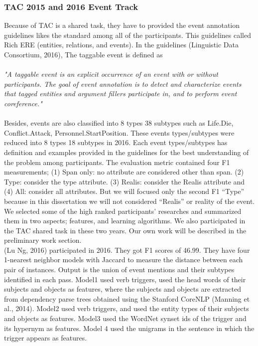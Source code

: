 \subsubsection{TAC 2015 and 2016 Event Track}
\label{tac}
Because of TAC is a shared task, they have to provided the event annotation guidelines likes the standard among all of the participants. This guidelines called Rich ERE (entities, relations, and events). In the guidelines (Linguistic Data Consortium, 2016), The taggable event is defined as \\ \\
\textit{"A taggable event is an explicit occurrence of an event with or without  participants. The goal of event annotation is to detect and characterize events  that tagged entities and argument fillers participate in, and to perform event coreference."} \\ \\
\indent Besides, events are also classified into 8 types 38 subtypes such as Life.Die, Conflict.Attack, Personnel.StartPosition. These events types/subtypes were reduced into 8 types 18 subtypes in 2016. Each event types/subtypes has definition and examples provided in the guidelines for the best understanding of the problem among participants. The evaluation metric contained four F1 measurements; (1) Span only: no attribute are considered other than span. (2) Type: consider the type attribute. (3) Realis: consider the Realis attribute and (4) All: consider all attributes. But we will focused only the second F1 “Type” because in this dissertation we will not considered “Realis” or reality of the event. We selected some of the high ranked participants’ researches and summarized them in two aspects; features, and learning algorithms. We also participated in the TAC shared task in these two years. Our own work will be described in the preliminary work section.\\
\indent (Lu Ng, 2016) participated in 2016. They got F1 scores of 46.99. They have four 1-nearest neighbor models with Jaccard to measure the distance between each pair of instances. Output is the union of event mentions and their subtypes identiﬁed in each pass. Model1 used verb triggers, used the head words of their subjects and objects as features, where the subjects and objects are extracted from dependency parse trees obtained using the Stanford CoreNLP (Manning et al., 2014). Model2 used verb triggers, and used the entity types of their subjects and objects as features. Model3 used the WordNet synset ids of the trigger and its hypernym as features. Model 4 used the unigrams in the sentence in which the trigger appears as features.\\
